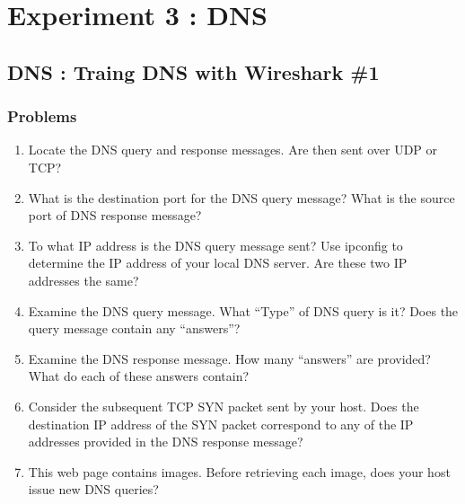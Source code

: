 \section{Experiment 3 : DNS}
\subsection{DNS : Traing DNS with Wireshark \#1}
    \subsubsection*{Problems}
    \begin{enumerate}[label=\bfseries Problem \arabic*:,leftmargin=*,labelindent=1em]
        \item Locate the DNS query and response messages. Are then sent over UDP or TCP?\\[0.2mm]
            \soln
            
        \item What is the destination port for the DNS query message? 
        What is the source port of DNS response message?\\[0.2mm]
            \soln
            
        \item To what IP address is the DNS query message sent? 
        Use ipconfig to determine the IP address of your local DNS server. 
        Are these two IP addresses the same?\\[0.2mm]
            \soln
            
        \item Examine the DNS query message. What “Type” of DNS query is it? 
        Does the query message contain any “answers”?\\[0.2mm]
            \soln
            
        \item Examine the DNS response message. How many “answers” are provided? 
        What do each of these answers contain?\\[0.2mm]
            \soln
            
        \item Consider the subsequent TCP SYN packet sent by your host.
        Does the destination IP address of the SYN packet correspond to any of the IP addresses 
        provided in the DNS response message?\\[0.2mm]
            \soln
            
        \item This web page contains images. Before retrieving each image, 
        does your host issue new DNS queries?\\[0.2mm]
            \soln
            
    \end{enumerate}
